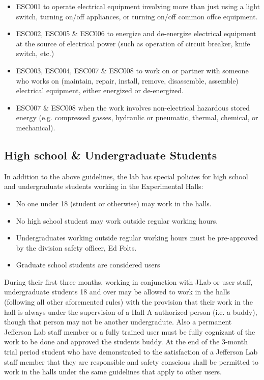 \documentclass[10pt]{article}
\begin{document}
\begin{itemize}

\item  ESC001   to operate electrical equipment involving more than just using a light switch, 
turning on/off appliances, or turning on/off common offce equipment. 

\item  ESC002, ESC005 \& ESC006    to energize and de-energize electrical equipment 
at the source of electrical power (such as operation of circuit breaker, knife switch, etc.)

\item  ESC003, ESC004, ESC007 \& ESC008    to work on or partner with someone who 
works on (maintain, repair, install, remove, disassemble, assemble) electrical equipment, either energized or de-energized. 

\item  ESC007 \& ESC008    when the work involves non-electrical hazardous 
stored energy (e.g. compressed gasses, hydraulic or pneumatic, thermal, chemical, or mechanical).

\end{itemize}


\subsection{High school \& Undergraduate Students}

In addition to the above guidelines, the lab has special policies for high school and undergraduate 
students working in the Experimental Halls:
\begin{itemize}
\item{No one under 18 (student or otherwise) may work in the halls.}
\item{No high school student may work outside regular working hours.}
\item{Undergraduates working outside regular working hours must be pre-approved by the division 
safety officer, Ed Folts.}
\item{Graduate school students are considered users}
\end{itemize}
During their first three months, working in conjunction with JLab or user staff, undergraduate students 
18 and over may be allowed to work in the halls (following all other aforemented rules)
with the provision that their work in the hall is always under the supervision of a 
Hall A authorized person (i.e. a buddy), though that person may not be another undergradute.
Also a permanent Jefferson Lab staff member or a fully trained user must
be fully cognizant of the work to be done and approved the students buddy. 
At the end of the 3-month trial period student who have demonstrated to the satisfaction of a Jefferson 
Lab staff member that they are responsible and safety conscious shall be permitted to work in the halls under the same guidelines that apply to other users.
\end{document}
